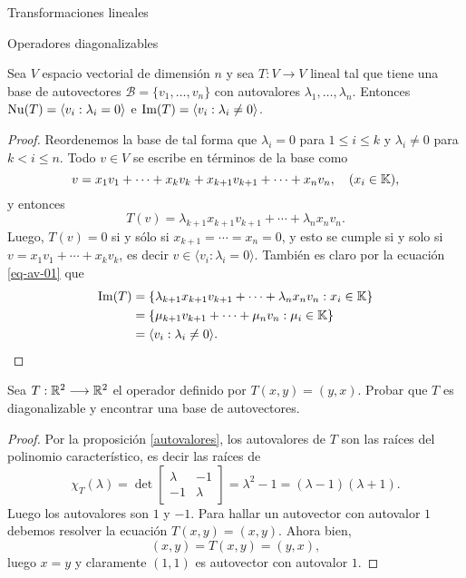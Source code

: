 \begin{chapter}{Transformaciones lineales}
\begin{section}{Operadores diagonalizables}
        \begin{proposicion} Sea $V$ espacio vectorial de dimensión $n$ y sea $T: V \to V$ lineal tal que tiene una base de autovectores $\mathcal{B} = \{v_1,\ldots,v_n \}$  con autovalores $\lambda_1,\ldots,\lambda_n$. Entonces $\operatorname{Nu}(T)=\langle v_i: \lambda_i =0 \rangle$ e  $\operatorname{Im}(T)=\langle v_i: \lambda_i \not=0 \rangle$.			
        \end{proposicion}
        \begin{proof} Reordenemos la base de tal forma que  $\lambda_i =0$ para $1 \le i \le k$ y $\lambda_i \ne 0$ para $k < i \le n$. 
        Todo $v \in V$ se escribe en términos de la base como 
        $$
        v = x_1v_1 + \cdots+ x_k v_k+ x_{k+1} v_{k+1}+\cdots+ x_n v_n,\quad (x_i \in \mathbb K),
        $$
        y entonces
        \begin{equation}\label{eq-av-01}
            T(v) =  \lambda_{k+1}x_{k+1} v_{k+1}+\cdots+ \lambda_nx_n v_n.
        \end{equation}
        Luego, $T(v) =0$ si y sólo si $x_{k+1} = \cdots = x_n=0$, y esto se cumple si y solo si $v =  x_1v_1 + \cdots+ x_k v_k$,  es decir $v \in \langle v_i: \lambda_i =0 \rangle$. 
        También es claro por la ecuación \eqref{eq-av-01} que 
        \begin{align*}
            \operatorname{Im}(T) &= \{\lambda_{k+1}x_{k+1} v_{k+1}+\cdots+ \lambda_nx_n v_n: x_i \in \mathbb K \} \\
            &=\{\mu_{k+1} v_{k+1}+\cdots+ \mu_n v_n: \mu_i \in \mathbb K \}\\
            &= \langle v_i: \lambda_i \not=0 \rangle.
        \end{align*}
        \end{proof}
        
        \begin{ejemplo*}
            Sea $T:\mathbb R^2 \longrightarrow \mathbb R^2$ el operador definido por $T(x,y)=(y,x)$. Probar que $T$ es diagonalizable y encontrar una base de autovectores. 
        \end{ejemplo*}
        \begin{proof}
            Por la proposición \ref{autovalores}, los autovalores de $T$  son las raíces del polinomio característico,  es decir las raíces de 
            $$
            \chi_T(\lambda)= \det\left[\begin{matrix}
            \lambda& -1 \\ -1 & \lambda
            \end{matrix} \right]= \lambda^2 -1  =(\lambda -1)(\lambda +1). 
            $$
            Luego los autovalores son $1$ y $-1$. Para hallar un autovector con autovalor $1$ debemos resolver la ecuación $T(x,y) = (x,y)$. Ahora bien, 
            $$
            (x,y) = T(x,y) = (y,x),
            $$
            luego $x =y$ y claramente $(1,1)$ es autovector con autovalor $1$.
            

\end{proof}
\end{section}
\end{chapter}
